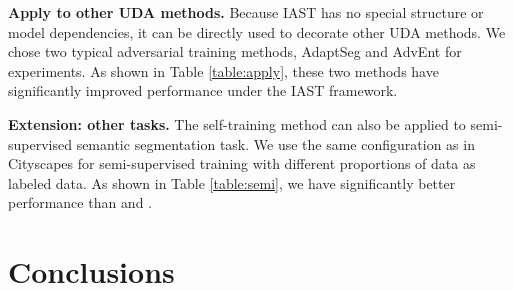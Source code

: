 \documentclass[runningheads]{llncs}
\begin{document}
\begin{table}
{
\label{table:apply}
}
\end{table}




\noindent\textbf{Apply to other UDA methods.} Because IAST has no special structure or model dependencies, it can be directly used to decorate other UDA methods. We chose two typical adversarial training methods, AdaptSeg\cite{tsai2018learning} and AdvEnt\cite{vu2019advent} for experiments. As shown in Table \ref{table:apply}, these two methods have significantly improved performance under the IAST framework.



\noindent\textbf{Extension: other tasks.} The self-training method can also be applied to semi-supervised semantic segmentation task. We use the same configuration as \cite{hung2019adversarial} in Cityscapes for semi-supervised training with different proportions of data as labeled data. As shown in Table \ref{table:semi}, we have significantly better performance than \cite{hung2019adversarial} and \cite{kalluri2019universal}.

 
\section{Conclusions}
\end{document}

